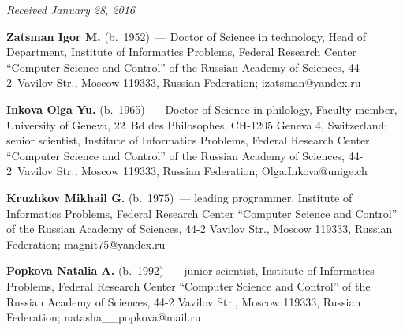 \vspace*{-3pt}

\hfill{\small\textit{Received January 28, 2016}}


\Contr

\noindent
\textbf{Zatsman Igor M.} (b.\ 1952)~--- Doctor of Science in technology, Head of Department, Institute 
of Informatics Problems, Federal Research Center ``Computer Science and Control'' of the Russian 
Academy of Sciences, 44-2~Vavilov Str., Moscow 119333, Russian Federation; izatsman@yandex.ru 

\vspace*{3pt}

\noindent
\textbf{Inkova Olga Yu.} (b.\ 1965)~---  Doctor of Science in philology, Faculty member, University of 
Geneva, 22~Bd des Philosophes, CH-1205 Geneva 4, Switzerland;  senior scientist, Institute of Informatics 
Problems, Federal Research Center ``Computer Science and Control'' of the Russian Academy of 
Sciences, 44-2~Vavilov Str., Moscow 119333, Russian Federation; Olga.Inkova@unige.ch 

\vspace*{3pt}

\noindent
\textbf{Kruzhkov Mikhail G.} (b.\ 1975)~---
leading programmer, Institute of Informatics Problems, Federal Research Center ``Computer Science 
and Control'' of the Russian Academy of Sciences, 44-2 Vavilov Str., Moscow 119333, Russian 
Federation; magnit75@yandex.ru 

\vspace*{3pt}

\noindent
\textbf{Popkova Natalia A.} (b.\ 1992)~--- junior scientist, Institute of Informatics Problems, Federal 
Research Center ``Computer Science and Control'' of the Russian Academy of Sciences, 44-2 Vavilov Str., 
Moscow 119333, Russian Federation; natasha\_\_popkova@mail.ru


   
\label{end\stat}


\renewcommand{\bibname}{\protect\rm Литература}